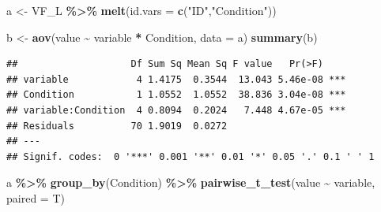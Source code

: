 \documentclass[
]{book}
\newenvironment{Shaded}{\begin{snugshade}}{\end{snugshade}}
\newcommand{\AttributeTok}[1]{\textcolor[rgb]{0.13,0.29,0.53}{#1}}
\newcommand{\FunctionTok}[1]{\textcolor[rgb]{0.13,0.29,0.53}{\textbf{#1}}}
\newcommand{\NormalTok}[1]{#1}
\newcommand{\OtherTok}[1]{\textcolor[rgb]{0.56,0.35,0.01}{#1}}
\newcommand{\SpecialCharTok}[1]{\textcolor[rgb]{0.81,0.36,0.00}{\textbf{#1}}}
\newcommand{\StringTok}[1]{\textcolor[rgb]{0.31,0.60,0.02}{#1}}
\begin{document}
\begin{Shaded}
\begin{Highlighting}[]
\NormalTok{a }\OtherTok{\textless{}{-}}\NormalTok{ VF\_L }\SpecialCharTok{\%\textgreater{}\%}
  \FunctionTok{melt}\NormalTok{(}\AttributeTok{id.vars =} \FunctionTok{c}\NormalTok{(}\StringTok{"ID"}\NormalTok{,}\StringTok{"Condition"}\NormalTok{)) }

\NormalTok{b }\OtherTok{\textless{}{-}} \FunctionTok{aov}\NormalTok{(value }\SpecialCharTok{\textasciitilde{}}\NormalTok{ variable }\SpecialCharTok{*}\NormalTok{ Condition, }\AttributeTok{data =}\NormalTok{ a)}
\FunctionTok{summary}\NormalTok{(b)}
\end{Highlighting}
\end{Shaded}

\begin{verbatim}
##                    Df Sum Sq Mean Sq F value   Pr(>F)    
## variable            4 1.4175  0.3544  13.043 5.46e-08 ***
## Condition           1 1.0552  1.0552  38.836 3.04e-08 ***
## variable:Condition  4 0.8094  0.2024   7.448 4.67e-05 ***
## Residuals          70 1.9019  0.0272                     
## ---
## Signif. codes:  0 '***' 0.001 '**' 0.01 '*' 0.05 '.' 0.1 ' ' 1
\end{verbatim}

\begin{Shaded}
\begin{Highlighting}[]
\NormalTok{a }\SpecialCharTok{\%\textgreater{}\%}
  \FunctionTok{group\_by}\NormalTok{(Condition) }\SpecialCharTok{\%\textgreater{}\%} 
  \FunctionTok{pairwise\_t\_test}\NormalTok{(value }\SpecialCharTok{\textasciitilde{}}\NormalTok{ variable, }\AttributeTok{paired =}\NormalTok{ T)}
\end{Highlighting}
\end{Shaded}
\end{document}
